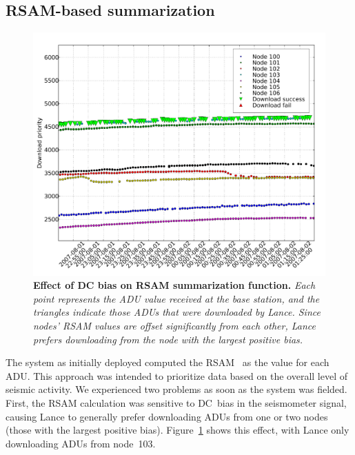 
\pagebreak
\subsection{RSAM-based summarization}

\begin{figure}[t]
\begin{center}
\includegraphics[width=1.0\hsize]{./lance/figs/deploy/downloads-pre-median-filter5.pdf}
\end{center}
\caption{\small {\bf Effect of DC bias on RSAM summarization
function.} {\em Each point represents the ADU value received at
the base station, and the triangles indicate those ADUs that were
downloaded by Lance. Since nodes' RSAM values are
offset significantly from each other, Lance prefers
downloading from the node with the largest positive bias.}}
\label{fig-rsam-dc-bias}
\end{figure}

The system as initially deployed computed the RSAM~\cite{rsam} as the
value for each ADU.
This approach was intended to prioritize data based on
the overall level of seismic activity. We experienced two problems as
soon as the system was fielded. First, the RSAM calculation was
sensitive to DC~bias in the seismometer signal, causing Lance to 
generally prefer downloading ADUs from one or two nodes (those with
the largest positive bias). Figure~\ref{fig-rsam-dc-bias} shows this
effect, with Lance only downloading ADUs from node~103.

